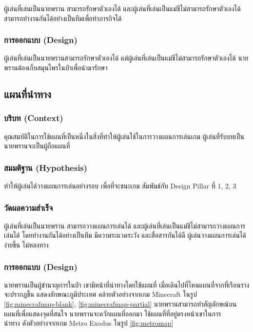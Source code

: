 ผู้เล่นที่เล่นเป็นนายพราน สามารถรักษาตัวเองได้ และผู้เล่นที่เล่นเป็นแม่ชีไม่สามารถรักษาตัวเองได้ สามารถทำงานกันได้อย่างเป็นทีมเพื่อทำภารกิจได้

\subsubsection{การออกแบบ (Design)}

ผู้เล่นที่เล่นเป็นนายพรานสามารถรักษาตัวเองได้ แต่ผู้เล่นที่เล่นเป็นแม่ชีไม่สามารถรักษาตัวเองได้
นายพรานต้องเก็บสมุนไพรในป่าเพื่อนำมารักษา

\subsection{แผนที่นำทาง}

\subsubsection{บริบท (Context)}
คุณสมบัติในการใช้แผนที่เป็นหนึ่งในสิ่งที่ทำให้ผู้เล่นใช้ในการวางแผนการเล่นเกม ผู้เล่นที่รับบทเป็นนายพรานจะเป็นผู้ถือแผนที่


\subsubsection{สมมติฐาน (Hypothesis)}
ทำให้ผู้เล่นได้วางแผนการเล่นอย่างรอบ เพื่อที่จะชนะเกม  สัมพันธ์กับ Design Pillar ที่ 1, 2, 3

\subsubsection{วัดผลความสำเร็จ}
ผู้เล่นที่เล่นเป็นนายพราน สามารถวางแผนการเล่นได้ และผู้เล่นที่เล่นเป็นแม่ชีไม่สามารถวางแผนการเล่นได้ โดยทำงานกันได้อย่างเป็นทีม มีความระแวดระวัง และสื่อสารกันได้ดี ผู้เล่นวางแผนการเล่นได้ง่ายขึ้น ไม่หลงทาง

\subsubsection{การออกแบบ (Design)}

นายพรานเป็นผู้ชำนาญการในป่า เขามีหน้าที่นำทางโดยใช้แผนที่ เมื่อเดินไปที่ไหนแผนที่จากที่เรือนรางจะปรากฏขึ้น แสดงลักษณะภูมิประเทศ คล้ายตัวอย่างจากเกม Minecraft ในรูป \ref{fig:minecrafmap-blank}, \ref{fig:minecrafmap-partial} นายพรานสามารถทำสัญลักษณ์บนแผนที่เพื่อแสดงจุดที่สนใจ นายพรานจะควักแผนที่ออกมา ใช้แผนที่ที่อยู่ตรงหน้าเขาในการ \\ นำทาง ดังตัวอย่างจากเกม Metro Exodus ในรูป \ref{fig:metromap}

